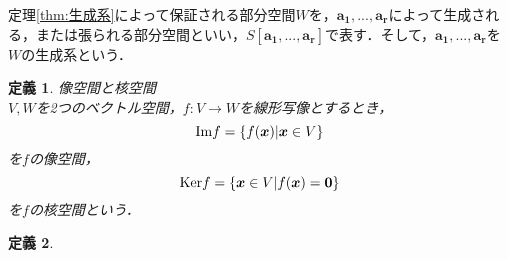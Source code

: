 \documentclass[uplatex]{jsarticle}
\newtheorem{definition}{定義}
\begin{document}
定理\ref{thm:生成系}によって保証される部分空間$W$を，$\bm{a_1}, ... , \bm{a_r}$によって生成される，または張られる部分空間といい，$S[\bm{a_1}, ..., \bm{a_r}]$で表す．そして，$\bm{a_1}, ..., \bm{a_r}$を$W$の生成系という．

\begin{definition}
    像空間と核空間\\
    $V, W$を2つのベクトル空間，$f:V \to W$を線形写像とするとき，$${\rm Im} f = \{f(\bm{x}) | \bm{x} \in V\}$$を$f$の像空間，$${\rm Ker} f = \{\bm{x} \in V | f(\bm{x}) = \bm{0}\}$$を$f$の核空間という．
\end{definition}

\begin{definition}
    
\end{definition}
\end{document}
